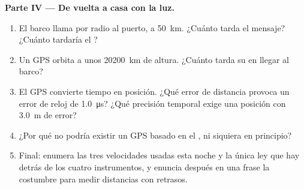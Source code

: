 \begin{problem}[{Problema de fin de semana --- leer las señales del
mundo: una sola ley, $d = v\,t$, mide una tormenta, cartografía un fondo
marino, cuenta un latido y deja entrever cómo funciona el GPS}]
\medskip
\noindent\textbf{Parte IV --- De vuelta a casa con la luz.}
\begin{enumerate}[resume]
  \item El barco llama por radio al puerto, a \qty{50}{km}. ¿Cuánto
        tarda el mensaje? ¿Cuánto tardaría el ?
  \item Un  GPS orbita a unos \qty{20200}{km} de altura.
        ¿Cuánto tarda su  en llegar al barco?
  \item El GPS convierte tiempo en posición. ¿Qué error de distancia
        provoca un error de reloj de \qty{1.0}{\micro s}? ¿Qué precisión
        temporal exige una posición con \qty{3.0}{m} de error?
  \item ¿Por qué no podría existir un GPS basado en el , ni
        siquiera en principio?
  \item Final: enumera las tres velocidades usadas esta noche y la única
        ley que hay detrás de los cuatro instrumentos, y enuncia después
        en una frase la costumbre para medir distancias con retrasos.
\end{enumerate}
\end{problem}
